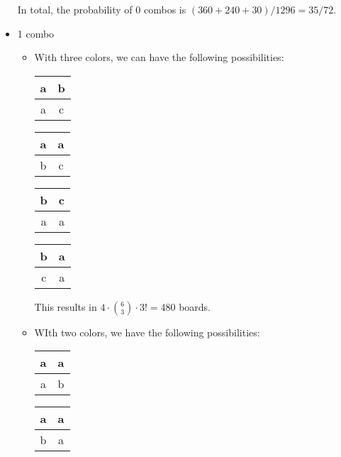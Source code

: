 \documentclass[12pt]{article}
\begin{document}
\begin{itemize}
\begin{itemize}
    \end{itemize}
    In total, the probability of 0 combos is $(360+240+30)/1296=35/72$.
    \item 1 combo
    \begin{itemize}
        \item With three colors, we can have the following possibilities:
        \begin{center}
            \begin{tabular}{|c|c|}
            \hline
            a & b \\
            \hline
            a & c \\
            \hline
            \end{tabular}
            \quad
            \begin{tabular}{|c|c|}
            \hline
            a & a \\
            \hline
            b & c \\
            \hline
            \end{tabular}
            \quad
            \begin{tabular}{|c|c|}
            \hline
            b & c \\
            \hline
            a & a \\
            \hline
            \end{tabular}
            \quad
            \begin{tabular}{|c|c|}
            \hline
            b & a \\
            \hline
            c & a \\
            \hline
            \end{tabular}
        \end{center}
        This results in $4\cdot \binom{6}{3}\cdot 3!=480$ boards.
        \item WIth two colors, we have the following possibilities:
        \begin{center}
            \begin{tabular}{|c|c|}
            \hline
            a & a \\
            \hline
            a & b \\
            \hline
            \end{tabular}
            \quad
            \begin{tabular}{|c|c|}
            \hline
            a & a \\
            \hline
            b & a \\

\end{tabular}
\end{center}
\end{itemize}
\end{itemize}
\end{document}
